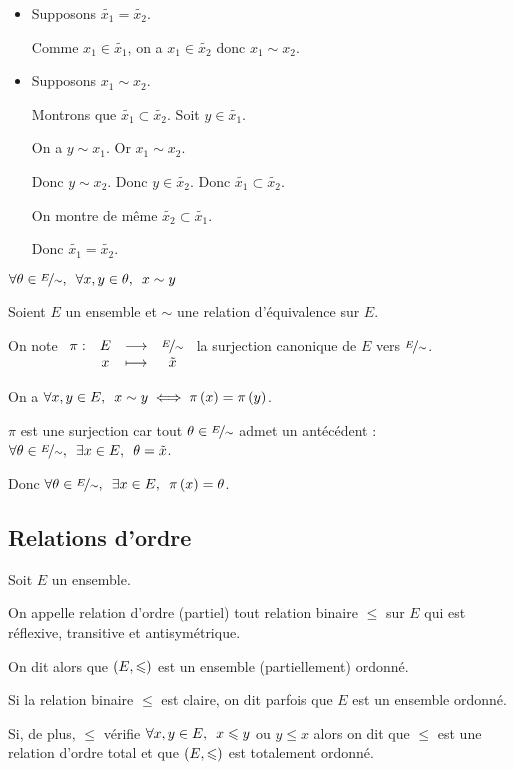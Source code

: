 \begin{dem}
\begin{itemize}
\begin{itemize}
\item[\impdir] Supposons \(\tilde{x_1}=\tilde{x_2}\).

Comme \(x_1\in\tilde{x_1}\), on a \(x_1\in\tilde{x_2}\) donc \(x_1\sim x_2\).

\item[\imprec] Supposons \(x_1\sim x_2\).

Montrons que \(\tilde{x_1}\subset\tilde{x_2}\). Soit \(y\in\tilde{x_1}\).

On a \(y\sim x_1\). Or \(x_1\sim x_2\).

Donc \(y\sim x_2\). Donc \(y\in\tilde{x_2}\). Donc \(\tilde{x_1}\subset\tilde{x_2}\).

On montre de même \(\tilde{x_2}\subset\tilde{x_1}\).

Donc \(\tilde{x_1}=\tilde{x_2}\).
\end{itemize}
\end{itemize}
\end{dem}

\begin{rem}
\(\quantifs{\forall\theta\in\classesdequiv{E};\forall x,y\in\theta}x\sim y\)
\end{rem}

\begin{rem}
Soient \(E\) un ensemble et \(\sim\) une relation d'équivalence sur \(E\).

On note \(\begin{array}[t]{cccc}\pi : & E & \longrightarrow & \nicefrac{E}{\sim} \\ & x & \longmapsto & \tilde{x}\end{array}\) la surjection canonique de \(E\) vers \(\nicefrac{E}{\sim}\).

On a \(\quantifs{\forall x,y\in E}x\sim y\iff\pi\paren{x}=\pi\paren{y}\).
\end{rem}

\begin{dem}
\(\pi\) est une surjection car tout \(\theta\in\nicefrac{E}{\sim}\) admet un antécédent : \(\quantifs{\forall\theta\in\classesdequiv{E};\exists x\in E}\theta=\tilde{x}\).

Donc \(\quantifs{\forall\theta\in\classesdequiv{E};\exists x\in E}\pi\paren{x}=\theta\).
\end{dem}

\subsection{Relations d'ordre}

\begin{defi}
Soit \(E\) un ensemble.

On appelle relation d'ordre (partiel) tout relation binaire \(\leq\) sur \(E\) qui est réflexive, transitive et antisymétrique.

On dit alors que \(\left(E,\leqslant\right)\) est un ensemble (partiellement) ordonné.

Si la relation binaire \(\leq\) est claire, on dit parfois que \(E\) est un ensemble ordonné.

Si, de plus, \(\leq\) vérifie \(\quantifs{\forall x,y\in E}x\leq y\) ou \(y\leq x\) alors on dit que \(\leq\) est une relation d'ordre total et que \(\left(E,\leqslant\right)\) est totalement ordonné.
\end{defi}

